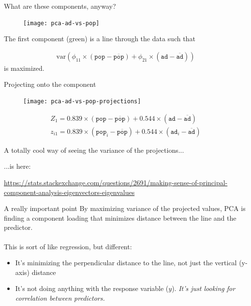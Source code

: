 \documentclass[mathserif]{beamer}
\begin{document}
\begin{frame}{What are these components, anyway?}

\begin{figure}
\texttt{[image: pca-ad-vs-pop]}
\end{figure}

The first component (green) is a line through the data such that 

\begin{align*}
\text{var}\left(\phi_{11}\times (\texttt{pop} - \overline{\texttt{pop}})+ \phi_{21}\times (\texttt{ad} - \overline{\texttt{ad}})\right)
\end{align*}
is maximized.
\end{frame}

\begin{frame}{Projecting onto the component}

\begin{figure}
\texttt{[image: pca-ad-vs-pop-projections]}
\end{figure}

\begin{align*}
Z_1 = 0.839\times (\texttt{pop} - \overline{\texttt{pop}})+ 0.544\times (\texttt{ad} - \overline{\texttt{ad}})\\
%
z_{i1} = 0.839\times (\texttt{pop}_i - \overline{\texttt{pop}})+ 0.544\times (\texttt{ad}_i - \overline{\texttt{ad}})
\end{align*}
\end{frame}

\begin{frame}{A totally cool way of seeing the variance of the projections...}

...is here:


\url{https://stats.stackexchange.com/questions/2691/making-sense-of-principal-component-analysis-eigenvectors-eigenvalues}
\end{frame}

\begin{frame}{A really important point}
By maximizing variance of the projected values, PCA is finding a component loading that minimizes distance between the line and the predictor.\\~\\

This is sort of like regression, but different:
\begin{itemize}
\item It's minimizing the perpendicular distance to the line, not just the vertical (y-axis) distance
\item It's not doing anything with the response variable ($y$).  \textit{It's just looking for correlation between predictors. }
\end{itemize}
\end{frame}
\end{document}
